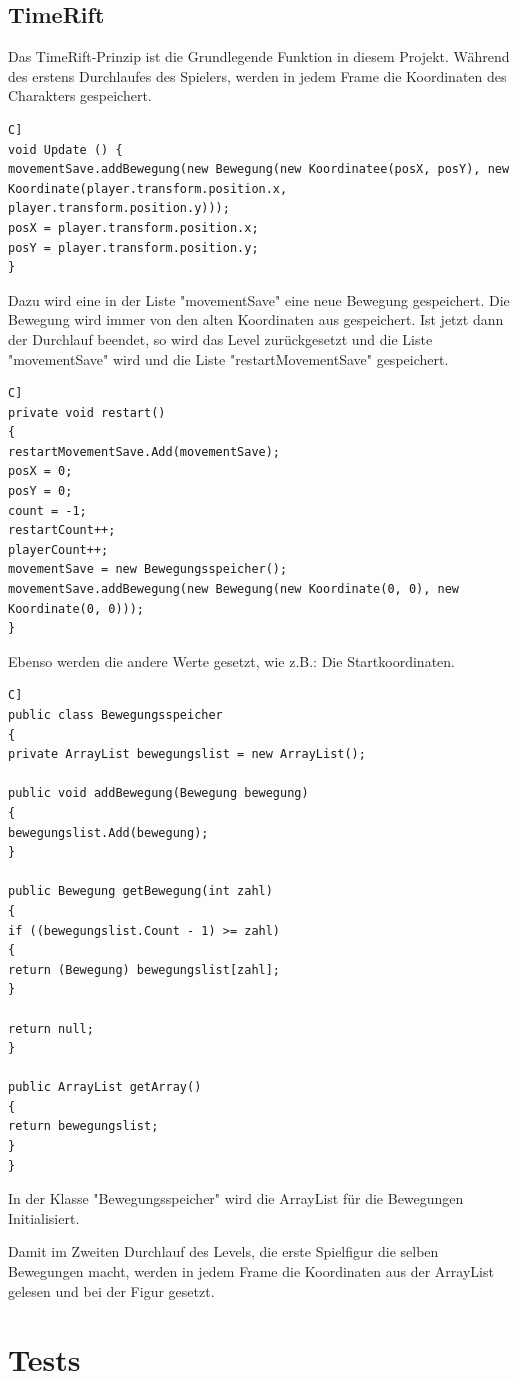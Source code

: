 \section{TimeRift}
Das TimeRift-Prinzip ist die Grundlegende Funktion in diesem Projekt. Während des erstens Durchlaufes des Spielers, werden in jedem Frame die Koordinaten des Charakters gespeichert.
\begin{lstlisting}[language=[Sharp]C]
void Update () {
movementSave.addBewegung(new Bewegung(new Koordinatee(posX, posY), new Koordinate(player.transform.position.x, player.transform.position.y)));
posX = player.transform.position.x;
posY = player.transform.position.y;
}
\end{lstlisting}
Dazu wird eine in der Liste "movementSave" eine neue Bewegung gespeichert. Die Bewegung wird immer von den alten Koordinaten aus gespeichert. Ist jetzt dann der Durchlauf beendet, so wird das Level zurückgesetzt und die Liste "movementSave" wird und die Liste "restartMovementSave" gespeichert.
\begin{lstlisting}[language=[Sharp]C]
private void restart()
{
restartMovementSave.Add(movementSave);
posX = 0;
posY = 0;
count = -1;
restartCount++;
playerCount++;
movementSave = new Bewegungsspeicher();
movementSave.addBewegung(new Bewegung(new Koordinate(0, 0), new Koordinate(0, 0)));
}
\end{lstlisting}
Ebenso werden die andere Werte gesetzt, wie z.B.: Die Startkoordinaten.
\begin{lstlisting}[language=[Sharp]C]
public class Bewegungsspeicher
{
private ArrayList bewegungslist = new ArrayList();

public void addBewegung(Bewegung bewegung)
{
bewegungslist.Add(bewegung);
}

public Bewegung getBewegung(int zahl)
{
if ((bewegungslist.Count - 1) >= zahl)
{
return (Bewegung) bewegungslist[zahl];
}

return null;
}

public ArrayList getArray()
{
return bewegungslist;
}
}
\end{lstlisting}
In der Klasse "Bewegungsspeicher" wird die ArrayList für die Bewegungen Initialisiert.

Damit im Zweiten Durchlauf des Levels, die erste Spielfigur die selben Bewegungen macht, werden in jedem Frame die Koordinaten aus der ArrayList gelesen und bei der Figur gesetzt.

\chapter{Tests}

